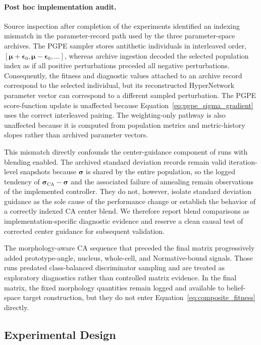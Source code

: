 \paragraph{Post hoc implementation audit.}
Source inspection after completion of the experiments identified an indexing mismatch in the parameter-record path used by the three parameter-space archives. The PGPE sampler stores antithetic individuals in interleaved order,
$[\boldsymbol{\mu}+\boldsymbol{\epsilon}_0,
\boldsymbol{\mu}-\boldsymbol{\epsilon}_0,\ldots]$, whereas archive ingestion decoded the selected population index as if all positive perturbations preceded all negative perturbations. Consequently, the fitness and diagnostic values attached to an archive record correspond to the selected individual, but its reconstructed HyperNetwork parameter vector can correspond to a different sampled perturbation. The PGPE score-function update is unaffected because Equation~\ref{eq:pgpe_sigma_gradient} uses the correct interleaved pairing. The weighting-only pathway is also unaffected because it is computed from population metrics and metric-history slopes rather than archived parameter vectors.

This mismatch directly confounds the center-guidance component of runs with blending enabled. The archived standard deviation records remain valid iteration-level snapshots because $\boldsymbol{\sigma}$ is shared by the entire population, so the logged tendency of $\boldsymbol{\sigma}_{\text{CA}}-\boldsymbol{\sigma}$ and the associated failure of annealing remain observations of the implemented controller. They do not, however, isolate standard deviation guidance as the sole cause of the performance change or establish the behavior of a correctly indexed CA center blend. We therefore report blend comparisons as implementation-specific diagnostic evidence and reserve a clean causal test of corrected center guidance for subsequent validation.

The morphology-aware CA sequence that preceded the final matrix progressively added prototype-angle, nucleus, whole-cell, and Normative-bound signals. Those runs predated class-balanced discriminator sampling and are treated as exploratory diagnostics rather than controlled matrix evidence. In the final matrix, the fixed morphology quantities remain logged and available to belief-space target construction, but they do not enter Equation~\ref{eq:composite_fitness} directly.

\subsection{Experimental Design}

